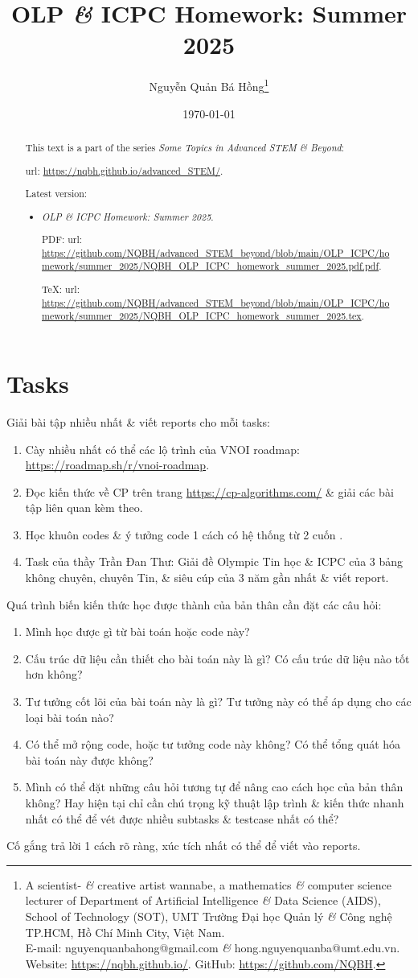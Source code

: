 \documentclass{article}
\title{OLP {\it\&} ICPC Homework: Summer 2025}
\author{Nguyễn Quản Bá Hồng\footnote{A scientist- {\it\&} creative artist wannabe, a mathematics {\it\&} computer science lecturer of Department of Artificial Intelligence {\it\&} Data Science (AIDS), School of Technology (SOT), UMT Trường Đại học Quản lý {\it\&} Công nghệ TP.HCM, Hồ Chí Minh City, Việt Nam.\\E-mail: {\sf nguyenquanbahong@gmail.com} {\it\&} {\sf hong.nguyenquanba@umt.edu.vn}. Website: \url{https://nqbh.github.io/}. GitHub: \url{https://github.com/NQBH}.}}
\date{\today}
\begin{document}
\maketitle
\begin{abstract}
    This text is a part of the series {\it Some Topics in Advanced STEM \& Beyond}:

    {\sc url}: \url{https://nqbh.github.io/advanced_STEM/}.

    Latest version:
    \begin{itemize}
        \item {\it OLP \& ICPC Homework: Summer 2025}.

        PDF: {\sc url}: \url{https://github.com/NQBH/advanced_STEM_beyond/blob/main/OLP_ICPC/homework/summer_2025/NQBH_OLP_ICPC_homework_summer_2025.pdf.pdf}.

        \TeX: {\sc url}: \url{https://github.com/NQBH/advanced_STEM_beyond/blob/main/OLP_ICPC/homework/summer_2025/NQBH_OLP_ICPC_homework_summer_2025.tex}.
    \end{itemize}
\end{abstract}
\tableofcontents


\section{Tasks}
Giải bài tập nhiều nhất \& viết reports cho mỗi tasks:
\begin{enumerate}
    \item Cày nhiều nhất có thể các lộ trình của VNOI roadmap:  \url{https://roadmap.sh/r/vnoi-roadmap}.
    \item Đọc kiến thức về CP trên trang \url{https://cp-algorithms.com/} \& giải các bài tập liên quan kèm theo.
    \item Học khuôn codes \& ý tưởng code 1 cách có hệ thống từ 2 cuốn \cite{Wu_Wang2016, Wu_Wang2018}.
    \item Task của thầy {\sc Trần Đan Thư}: Giải đề Olympic Tin học \& ICPC của 3 bảng không chuyên, chuyên Tin, \& siêu cúp của 3 năm gần nhất \& viết report.
\end{enumerate}
Quá trình biến kiến thức học được thành của bản thân cần đặt các câu hỏi:
\begin{enumerate}
    \item Mình học được gì từ bài toán hoặc code này?
    \item Cấu trúc dữ liệu cần thiết cho bài toán này là gì? Có cấu trúc dữ liệu nào tốt hơn không?
    \item Tư tưởng cốt lõi của bài toán này là gì? Tư tưởng này có thể áp dụng cho các loại bài toán nào?
    \item Có thể mở rộng code, hoặc tư tưởng code này không? Có thể tổng quát hóa bài toán này được không?
    \item Mình có thể đặt những câu hỏi tương tự để nâng cao cách học của bản thân không? Hay hiện tại chỉ cần chú trọng kỹ thuật lập trình \& kiến thức nhanh nhất có thể để vét được nhiều subtasks \& testcase nhất có thể?
\end{enumerate}
Cố gắng trả lời 1 cách rõ ràng, xúc tích nhất có thể để viết vào reports.
\end{document}

